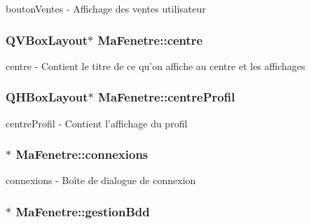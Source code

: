 bouton\-Ventes -\/ Affichage des ventes utilisateur 

\hypertarget{class_ma_fenetre_aefa40adcb6099816353c31ea230ec1af}{
\subsubsection[{centre}]{\setlength{\rightskip}{0pt plus 5cm}Q\-V\-Box\-Layout$\ast$ Ma\-Fenetre\-::centre\hspace{0.3cm}{\ttfamily [protected]}}}\label{class_ma_fenetre_aefa40adcb6099816353c31ea230ec1af}


centre -\/ Contient le titre de ce qu'on affiche au centre et les affichages 

\hypertarget{class_ma_fenetre_a6e267fbdcd8da190e956c593664587c6}{
\subsubsection[{centre\-Profil}]{\setlength{\rightskip}{0pt plus 5cm}Q\-H\-Box\-Layout$\ast$ Ma\-Fenetre\-::centre\-Profil\hspace{0.3cm}{\ttfamily [protected]}}}\label{class_ma_fenetre_a6e267fbdcd8da190e956c593664587c6}


centre\-Profil -\/ Contient l'affichage du profil 

\hypertarget{class_ma_fenetre_a3c115601ad85a01422813dcdf48eb44d}{
\subsubsection[{connexions}]{$\ast$ Ma\-Fenetre\-::connexions\hspace{0.3cm}{\ttfamily [protected]}}}\label{class_ma_fenetre_a3c115601ad85a01422813dcdf48eb44d}


connexions -\/ Boîte de dialogue de connexion 

\hypertarget{class_ma_fenetre_a34d71a96cedb508c72afb02c70ff9609}{
\subsubsection[{gestion\-Bdd}]{$\ast$ Ma\-Fenetre\-::gestion\-Bdd\hspace{0.3cm}{\ttfamily [protected]}}}\label{class_ma_fenetre_a34d71a96cedb508c72afb02c70ff9609}



